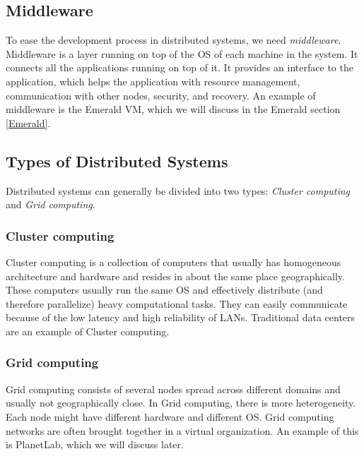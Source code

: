 \subsection{Middleware}
To ease the development process in distributed systems, we need \textit{middleware}. Middleware is a layer running on top of the OS of each machine in the system. It connects all the applications running on top of it. It provides an interface to the application, which helps the application with resource management, communication with other nodes, security, and recovery\cite{steen_distributed_2017}. An example of middleware is the Emerald VM, which we will discuss in the Emerald section \ref{Emerald}. 


\subsection{Types of Distributed Systems}
Distributed systems can generally be divided into two types: \textit{Cluster computing} and \textit{Grid computing}.

\subsubsection{Cluster computing}
Cluster computing is a collection of computers that usually has homogeneous architecture and hardware and resides in about the same place geographically. These computers usually run the same OS and effectively distribute (and therefore parallelize) heavy computational tasks. They can easily communicate because of the low latency and high reliability of LANs. Traditional data centers are an example of Cluster computing. 

\subsubsection{Grid computing}
Grid computing consists of several nodes spread across different domains and usually not geographically close. In Grid computing, there is more heterogeneity. Each node might have different hardware and different OS. Grid computing networks are often brought together in a virtual organization. An example of this is PlanetLab, which we will discuss later. 








